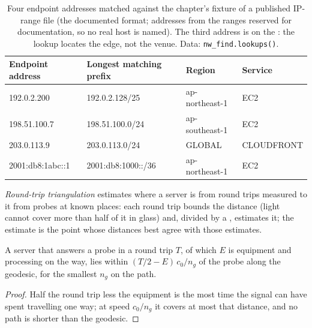 \begin{table}[ht]
\centering\small
\begin{tabular}{llll}
\toprule
Endpoint address & Longest matching prefix & Region & Service \\
\midrule
192.0.2.200 & 192.0.2.128/25 & ap-northeast-1 & EC2 \\
198.51.100.7 & 198.51.100.0/24 & ap-southeast-1 & EC2 \\
203.0.113.9 & 203.0.113.0/24 & GLOBAL & CLOUDFRONT \\
2001:db8:1abc::1 & 2001:db8:1000::/36 & ap-northeast-1 & EC2 \\
\bottomrule
\end{tabular}
\caption{Four endpoint addresses matched against the chapter's fixture of a published IP-range file (the documented format; addresses from the
ranges reserved for documentation, so no real host is named). The third address is on the : the lookup locates the edge, not the
venue. Data: \texttt{nw\_find.lookups()}.}\label{tab:nw:where-the-crypto-venues-live:lookups}
\end{table}

\begin{definition}\label{def:nw:where-the-crypto-venues-live:tri}
\emph{Round-trip triangulation} estimates where a server is from round trips measured to it from probes at known
places: each round trip bounds the distance (light cannot cover more than half of it in glass) and, divided by a , estimates it; the
estimate is the point whose distances best agree with those estimates.
\end{definition}

\begin{proposition}\label{prop:nw:where-the-crypto-venues-live:bound}
A server that answers a probe in a round trip $T$, of which $E$ is equipment and processing on the way, lies within $(T/2 - E)\,c_0/n_g$ of the
probe along the geodesic, for the smallest  $n_g$ on the path.
\end{proposition}

\begin{proof}
Half the round trip less the equipment is the most time the signal can have spent travelling one way; at speed $c_0/n_g$ it covers at most that
distance, and no path is shorter than the geodesic.
\end{proof}

